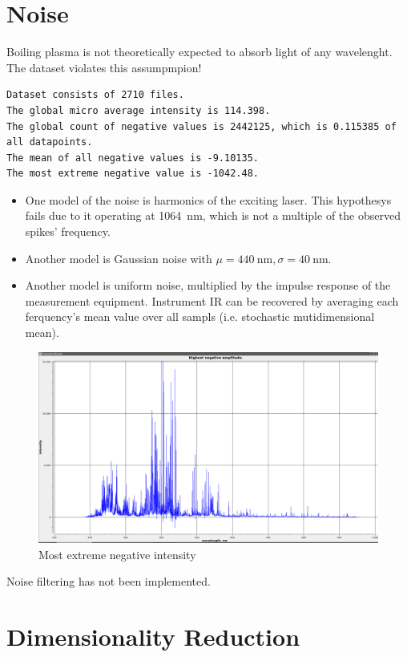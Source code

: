 \documentclass{article}
\begin{document}
\section{Noise}
Boiling plasma is not theoretically expected to absorb light of any wavelenght.
The dataset violates this assumpmpion!
\par
\begin{verbatim}
Dataset consists of 2710 files.
The global micro average intensity is 114.398.
The global count of negative values is 2442125, which is 0.115385 of all datapoints.
The mean of all negative values is -9.10135.
The most extreme negative value is -1042.48.
\end{verbatim}
\begin{itemize}
\item{One model of the noise is harmonics of the exciting laser.
This hypothesys fails due to it operating at \SI{1064}{\nano\metre}, which is not a multiple of the observed spikes' frequency.}
\item{Another model is Gaussian noise with $\mu=\SI{440}{\nano\metre}, \sigma=\SI{40}{\nano\metre}$.}
\item{Another model is uniform noise, multiplied by the impulse response of the measurement equipment.
Instrument IR can be recovered by averaging each ferquency's mean value over all sampls (i.e. stochastic mutidimensional mean).}
\end{itemize}
\begin{figure}
\caption{Most extreme negative intensity}
\centering
\includegraphics[width=1.25\textwidth]{img/negatives}
\end{figure}
Noise filtering has not been implemented.


\section{Dimensionality Reduction}
\end{document}
